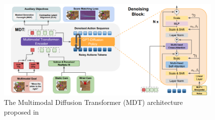 \begin{figure}[t]
    \centering
    \includegraphics[width=\textwidth]{figures/images/mdt/mdt_architecture.png}
    \caption{The Multimodal Diffusion Transformer (MDT) architecture proposed in \cite{reuss2024multimodal}}
    \label{fig:mdt_architecture}
\end{figure}